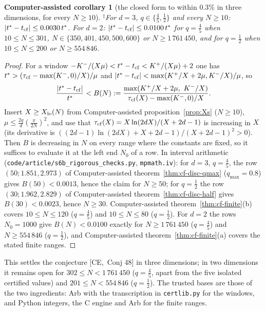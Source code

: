 \documentclass[10pt,a4paper]{article}
\theoremstyle{plain}
\newtheorem{cacorollary}[theorem]{Computer-assisted corollary}
\theoremstyle{definition}
\newcommand{\SYN}{\ensuremath{^{\ddagger}}}      %
\newcommand{\src}[2]{[\textsf{#1},~#2]}           %
\newcommand{\CER}{\textsf{CE}}
\begin{document}
\begin{cacorollary}[the closed form to within $0.3\%$ in three dimensions, for every $N\ge10$]\SYN\label{cor:conj48}
For $d=3$, $q\in\{\frac45,\frac12\}$ and every $N\ge10$: $|t^*-t_{\rm cf}|\le0.0030\,t^*$. For $d=2$: $|t^*-t_{\rm cf}|\le0.0100\,t^*$ for $q=\frac45$ when $10\le N\le301$, $N\in\{350,401,450,500,600\}$ or $N\ge1\,761\,450$, and for $q=\frac12$ when $10\le N\le200$ or $N\ge554\,846$.
\end{cacorollary}
\begin{proof}
For a window $-K^-/(X\mu)<t^*-t_{\rm cf}<K^+/(X\mu)+2$ one has $t^*>(\tau_{\rm cf}-\max(K^-,0)/X)/\mu$ and $|t^*-t_{\rm cf}|<\max(K^+/X+2\mu,K^-/X)/\mu$, so
\[
\frac{|t^*-t_{\rm cf}|}{t^*}<B(N):=\frac{\max(K^+/X+2\mu,\ K^-/X)}{\tau_{\rm cf}(X)-\max(K^-,0)/X}.
\]
Insert $X\ge X_{\rm lo}(N)$ from Computer-assisted proposition~\ref{prop:Xs} ($N\ge10$), $\mu\le\frac{2q}d(\frac\pi{2N})^2$, and use that $\tau_{\rm cf}(X)=X\ln(2dX)/(X+2d-1)$ is increasing in $X$ (its derivative is $((2d-1)\ln(2dX)+X+2d-1)/(X+2d-1)^2>0$). Then $B$ is decreasing in $N$ on every range where the constants are fixed, so it suffices to evaluate it at the left end $N_0$ of a row. In interval arithmetic (\texttt{code/article/s6b\_rigorous\_checks.py}, \texttt{mpmath.iv}): for $d=3$, $q=\frac45$, the row $(50;1.851,2.973)$ of Computer-assisted theorem~\ref{thm:cf-disc-qmax} ($q_{\max}=0.8$) gives $B(50)<0.0013$, hence the claim for $N\ge50$; for $q=\frac12$ the row $(30;1.962,2.829)$ of Computer-assisted theorem~\ref{thm:cf-disc-half} gives $B(30)<0.0023$, hence $N\ge30$. Computer-assisted theorem~\ref{thm:cf-finite}(b) covers $10\le N\le120$ ($q=\frac45$) and $10\le N\le80$ ($q=\frac12$). For $d=2$ the rows $N_0=1000$ give $B(N)<0.0100$ exactly for $N\ge1\,761\,450$ ($q=\frac45$) and $N\ge554\,846$ ($q=\frac12$), and Computer-assisted theorem~\ref{thm:cf-finite}(a) covers the stated finite ranges.
\end{proof}
This settles the conjecture \src{\CER}{Conj 48} in three dimensions; in two dimensions it remains open for $302\le N<1\,761\,450$ ($q=\frac45$, apart from the five isolated certified values) and $201\le N<554\,846$ ($q=\frac12$). The trusted bases are those of the two ingredients: Arb with the transcription in \texttt{certlib.py} for the windows, and Python integers, the C engine and Arb for the finite ranges.
\end{document}
